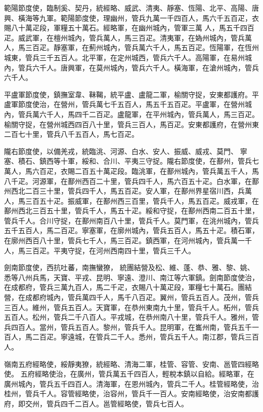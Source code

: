 \begin{pinyinscope}
 範陽節度使，臨制奚、契丹，統經略、威武、清夷、靜塞、恆陽、北平、高陽、唐興、橫海等九軍。範陽節度使，理幽州，管兵九萬一千四百人，馬六千五百疋，衣賜八十萬疋段，軍糧五十萬石。經略軍，在幽州城內，管軍三萬
 人，馬五千四百疋。威武軍，在檀州城內，管兵萬人，馬三百疋。清夷軍，在媯州城內，管兵萬人，馬三百疋。靜塞軍，在薊州城內，管兵萬六千人，馬五百疋。恆陽軍，在恆州城東，管兵三千五百人。北平軍，在定州城西，管兵六千人。高陽軍，在易州城內，管兵六千人。唐興軍，在莫州城內，管兵六千人。橫海軍，在滄州城內，管兵六千人。



 平盧軍節度使，鎮撫室韋、靺鞨，統平盧、盧龍二軍，榆關守捉，安東都護府。平盧軍節度使治，在營州，管兵萬七千五百人，馬五千五百疋。平盧軍，在營州城內，管兵萬六千人，馬四千二百疋。盧龍軍，在平州城內，管兵萬人，馬三百疋。榆關守捉，在營州城西四百八十里，管兵三百人，馬百疋。安東都護府，在營州東二百七十里，管兵八千五百人，馬七百疋。



 隴右節度使，以備羌戎，統臨洮、河源、白水、安人、振威、威戎、莫門、
 寧塞、積石、鎮西等十軍，綏和、合川、平夷三守捉。隴右節度使，在鄯州，管兵七萬人，馬六百疋，衣賜二百五十萬疋段。臨洮軍，在鄯州城內，管兵萬五千人，馬八千疋。河源軍，在鄯州西百二十里，管兵四千人，馬六百五十疋。白水軍，在鄯州西北二百三十里，管兵四千人，馬五百疋。安人軍，在鄯州界星宿川西，兵萬人，馬三百五十疋。振威軍，在鄯州西三百里，管兵千人，馬五百疋。威戎軍，在鄯州西北三百五十里，管兵千人，馬五十疋。綏和守捉，在鄯州西南二百五十里，管兵千人。合川守捉，在鄯州南百八十里，管兵千人。莫門軍，在洮州城內，管兵五千五百人，馬二百疋。寧塞軍，在廓州城內，管兵五百人，馬五十疋。積石軍，在廓州西百八十里，管兵七千人，馬三百疋。鎮西軍，在河州城內，管兵萬一千人，馬三百疋。平夷守捉，在河州西南四十里，管兵三千人。



 劍南節度使，西抗吐蕃，南撫蠻獠，
 統團結營及松、維、蓬、恭、雅、黎、姚、悉等八州兵馬，天寶、平戎、昆明、寧遠、澄川、南江等六軍鎮。劍南節度使治，在成都府，管兵三萬九百人，馬二千疋，衣賜八十萬疋段，軍糧七十萬石。團結營，在成都府城內，管兵萬四千人，馬千八百疋。翼州，管兵五百人。茂州，管兵三百人。維州，管兵五百人。天寶軍，在恭州東南九十里，管兵千人。柘州，管兵五百人。松州，管兵二千八百人。平戎城，在恭州南八十里，管兵千人。雅州，管兵四百人。當州，管兵五百人。黎州，管兵千人。昆明軍，在巂州南，管兵五千一百人，馬二百疋。寧遠城，在管兵二千人。悉州，管兵五千人。南江郡，管兵三百人。



 嶺南五府經略使，綏靜夷獠，統經略、清海二軍，桂管、容管、安南、邕管四經略使。
 五府經略使治，在廣州，管兵萬五千四百人，輕稅本鎮以自給。經略軍，在廣州城內，管兵五千四百人。清海軍，在恩州城內，管兵二千人。桂管經略使，治桂州，管兵千人。容管經略使，治容州，管兵千一百人。安南經略使，治安南都護府，即交州，管兵四千二百人。邕管經略使，管兵七百人。




\end{pinyinscope}
